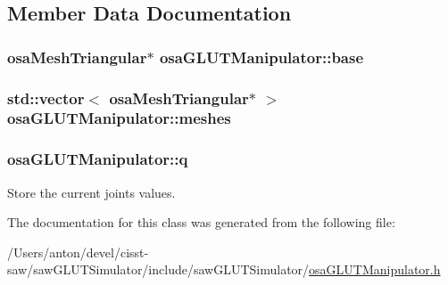 \subsection{Member Data Documentation}
\hypertarget{classosa_g_l_u_t_manipulator_a35862797c40d1a7bf6bf98cb3cec86a8}{}
\subsubsection[{base}]{\setlength{\rightskip}{0pt plus 5cm}osa\+Mesh\+Triangular$\ast$ osa\+G\+L\+U\+T\+Manipulator\+::base\hspace{0.3cm}{\ttfamily [protected]}}\label{classosa_g_l_u_t_manipulator_a35862797c40d1a7bf6bf98cb3cec86a8}
\hypertarget{classosa_g_l_u_t_manipulator_a72841d530b9d0d41cb22cbad04087e34}{}
\subsubsection[{meshes}]{\setlength{\rightskip}{0pt plus 5cm}std\+::vector$<$ osa\+Mesh\+Triangular$\ast$ $>$ osa\+G\+L\+U\+T\+Manipulator\+::meshes\hspace{0.3cm}{\ttfamily [protected]}}\label{classosa_g_l_u_t_manipulator_a72841d530b9d0d41cb22cbad04087e34}
\hypertarget{classosa_g_l_u_t_manipulator_aaa03cdd6825dd64f23586ab753579ffa}{}
\subsubsection[{q}]{ osa\+G\+L\+U\+T\+Manipulator\+::q\hspace{0.3cm}{\ttfamily [protected]}}\label{classosa_g_l_u_t_manipulator_aaa03cdd6825dd64f23586ab753579ffa}


Store the current joints values. 



The documentation for this class was generated from the following file\+:\begin{DoxyCompactItemize}
\item 
/\+Users/anton/devel/cisst-\/saw/saw\+G\+L\+U\+T\+Simulator/include/saw\+G\+L\+U\+T\+Simulator/\hyperlink{osa_g_l_u_t_manipulator_8h}{osa\+G\+L\+U\+T\+Manipulator.\+h}\end{DoxyCompactItemize}
